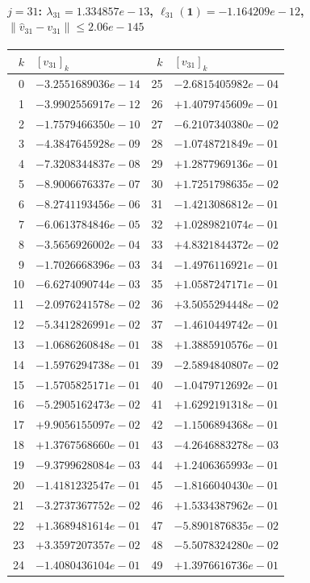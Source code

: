 \documentclass[11pt]{article}
\begin{document}
\paragraph{$j = 31$: $\lambda_{31} = 1.334857e-13$, \quad $\ell_{31}(\mathbf{1}) = -1.164209e-12$, \quad $\|\hat v_{31} - v_{31}\| \leq 2.06e-145$}
\begin{center}
{\footnotesize
\begin{tabular}{r@{\;\;}l@{\quad}r@{\;\;}l}
\toprule
$k$ & $[v_{31}]_k$ & $k$ & $[v_{31}]_k$ \\
\midrule
0 & $-3.2551689036e-14$ & 25 & $-2.6815405982e-04$ \\
1 & $-3.9902556917e-12$ & 26 & $+1.4079745609e-01$ \\
2 & $-1.7579466350e-10$ & 27 & $-6.2107340380e-02$ \\
3 & $-4.3847645928e-09$ & 28 & $-1.0748721849e-01$ \\
4 & $-7.3208344837e-08$ & 29 & $+1.2877969136e-01$ \\
5 & $-8.9006676337e-07$ & 30 & $+1.7251798635e-02$ \\
6 & $-8.2741193456e-06$ & 31 & $-1.4213086812e-01$ \\
7 & $-6.0613784846e-05$ & 32 & $+1.0289821074e-01$ \\
8 & $-3.5656926002e-04$ & 33 & $+4.8321844372e-02$ \\
9 & $-1.7026668396e-03$ & 34 & $-1.4976116921e-01$ \\
10 & $-6.6274090744e-03$ & 35 & $+1.0587247171e-01$ \\
11 & $-2.0976241578e-02$ & 36 & $+3.5055294448e-02$ \\
12 & $-5.3412826991e-02$ & 37 & $-1.4610449742e-01$ \\
13 & $-1.0686260848e-01$ & 38 & $+1.3885910576e-01$ \\
14 & $-1.5976294738e-01$ & 39 & $-2.5894840807e-02$ \\
15 & $-1.5705825171e-01$ & 40 & $-1.0479712692e-01$ \\
16 & $-5.2905162473e-02$ & 41 & $+1.6292191318e-01$ \\
17 & $+9.9056155097e-02$ & 42 & $-1.1506894368e-01$ \\
18 & $+1.3767568660e-01$ & 43 & $-4.2646883278e-03$ \\
19 & $-9.3799628084e-03$ & 44 & $+1.2406365993e-01$ \\
20 & $-1.4181232547e-01$ & 45 & $-1.8166040430e-01$ \\
21 & $-3.2737367752e-02$ & 46 & $+1.5334387962e-01$ \\
22 & $+1.3689481614e-01$ & 47 & $-5.8901876835e-02$ \\
23 & $+3.3597207357e-02$ & 48 & $-5.5078324280e-02$ \\
24 & $-1.4080436104e-01$ & 49 & $+1.3976616736e-01$ \\
\bottomrule
\end{tabular}
}
\end{center}
\end{document}
